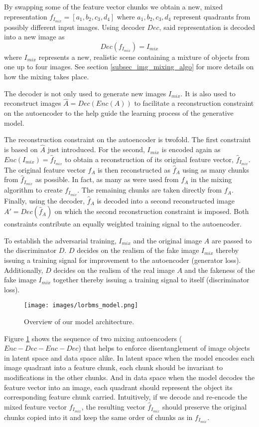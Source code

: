 \documentclass[12pt,a4paper]{article}
\begin{document}
By swapping some of the feature vector chunks we obtain a new, mixed representation $f_{I_{mix}} = [a_1, b_2, c_3, d_4]$ where $a_1,b_2,c_3,d_4$ represent quadrants from possibly different input images. Using decoder $Dec$, said representation is decoded into a new image as
\begin{equation} \label{eq:3}
    Dec(f_{I_{mix}}) = I_{mix}
\end{equation}
where $I_{mix}$ represents a new, realistic scene containing a mixture of objects from one up to four images. See section \ref{subsec_img_mixing_algo} for more details on how the mixing takes place.

The decoder is not only used to generate new images $I_{mix}$. It is also used to reconstruct images $\hat{A} = Dec(Enc(A))$ to facilitate a reconstruction constraint on the autoencoder to the help guide the learning process of the generative model.

The reconstruction constraint on the autoencoder is twofold. The first constraint is based on $\hat{A}$ just introduced. For the second, $I_{mix}$ is encoded again as $Enc(I_{mix}) = \hat{f}_{I_{mix}}$ to obtain a reconstruction of its original feature vector, $\hat{f}_{I_{mix}}$. The original feature vector $f_A$ is then reconstructed as $\hat{f}_A$ using as many chunks from $\hat{f}_{I_{mix}}$ as possible. In fact, as many as were used from $f_A$ in the mixing algorithm to create $f_{I_{mix}}$. The remaining chunks are taken directly from $f_A$. Finally, using the decoder, $\hat{f}_A$ is decoded into a second reconstructed image $A' = Dec(\hat{f}_A)$ on which the second reconstruction constraint is imposed. Both constraints contribute an equally weighted training signal to the autoencoder.

To establish the adversarial training, $I_{mix}$ and the original image $A$ are passed to the discriminator $D$. $D$ decides on the realism of the fake image $I_{mix}$ thereby issuing a training signal for improvement to the autoencoder (generator loss). Additionally, $D$ decides on the realism of the real image $A$ and the fakeness of the fake image $I_{mix}$ together thereby issuing a training signal to itself (discriminator loss).

\begin{figure}[ht]
\centering
\texttt{[image: images/lorbms\_model.png]}
\caption{Overview of our model architecture.}
\label{fig:model_arch}
\end{figure}

Figure \ref{fig:model_arch} shows the sequence of two mixing autoencoders ($Enc-Dec-Enc-Dec$) that helps to enforce disentanglement of image objects in latent space and data space alike. In latent space when the model encodes each image quadrant into a feature chunk, each chunk should be invariant to modifications in the other chunks. And in data space when the model decodes the feature vector into an image, each quadrant should represent the object its corresponding feature chunk carried. Intuitively, if we decode and re-encode the mixed feature vector $f_{I_{mix}}$, the resulting vector $\hat{f}_{I_{mix}}$ should preserve the original chunks copied into it and keep the same order of chunks as in $f_{I_{mix}}$.
\end{document}
